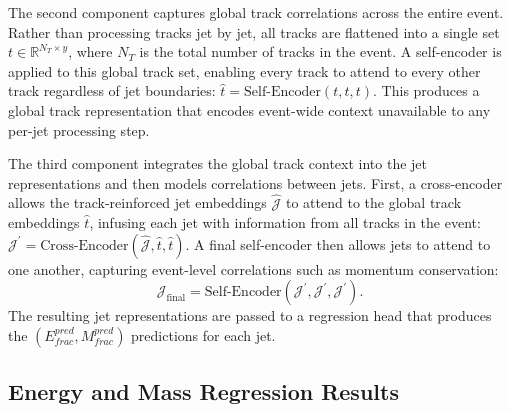 The second component captures global track correlations across the entire event. 
Rather than processing tracks jet by jet, all tracks are flattened into a single set $t \in \mathbb{R}^{N_T \times y}$, where $N_T$ is the total number of tracks in the event. 
A self-encoder is applied to this global track set, enabling every track to attend to every other track regardless of jet boundaries: $\hat{t} = \text{Self-Encoder}(t,t,t)$. 
This produces a global track representation that encodes event-wide context unavailable to any per-jet processing step.

The third component integrates the global track context into the jet representations and then models correlations between jets. 
First, a cross-encoder allows the track-reinforced jet embeddings $\hat{\mathcal{J}}$ to attend to the global track embeddings $\hat{t}$, infusing each jet with information from all tracks in the event: $\mathcal{J}^{\prime} = \text{Cross-Encoder}(\hat{\mathcal{J}},\hat{t},\hat{t})$.
A final self-encoder then allows jets to attend to one another, capturing event-level correlations such as momentum conservation:
\begin{equation}
    \mathcal{J}_{\text{final}} = \text{Self-Encoder}(\mathcal{J}^{\prime},\mathcal{J}^{\prime},\mathcal{J}^{\prime}).
\end{equation} 
The resulting jet representations are passed to a regression head that produces the $(E_{frac}^{pred}, M_{frac}^{pred})$ predictions for each jet.

\subsection{Energy and Mass Regression Results}\label{sec:puminet_results}

